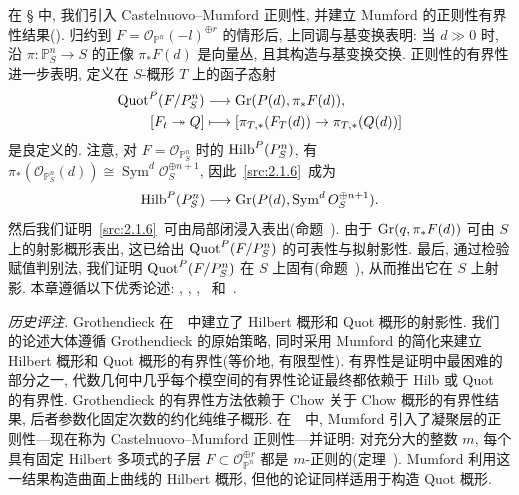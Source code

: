 在 \S{} 中, 我们引入 Castelnuovo--Mumford 正则性, 并建立 Mumford 的正则性有界性结果().
归约到 $F=\mathcal O_{\mathbb P^n}(-l)^{\oplus r}$ 的情形后, 上同调与基变换表明: 当 $d\gg0$ 时, 沿 $\pi:\mathbb P_S^n\to S$ 的正像 $\pi_*F(d)$ 是向量丛, 且其构造与基变换交换. 正则性的有界性进一步表明, 定义在 $S$-概形 $T$ 上的函子态射
\begin{equation}\label{src:2.1.6}
\begin{aligned}
\operatorname{Quot}^P(F/P_S^n)&\longrightarrow\operatorname{Gr}(P(d),\pi_*F(d)),\\
[F_t\twoheadrightarrow Q]&\longmapsto
[\pi_{T,*}(F_T(d))\to\pi_{T,*}(Q(d))]
\end{aligned}
\end{equation}
是良定义的. 注意, 对 $F=\mathcal O_{\mathbb P_S^n}$ 时的 $\operatorname{Hilb}^P(P_S^n)$, 有
$\pi_*(\mathcal O_{\mathbb P_S^n}(d))\cong\operatorname{Sym}^d\mathcal O_S^{\oplus n+1}$, 
因此~\eqref{src:2.1.6}~成为
\[
\operatorname{Hilb}^P(P_S^n)\longrightarrow
\operatorname{Gr}(P(d),\operatorname{Sym}^dO_S^{\oplus n+1}).
\]
然后我们证明~\eqref{src:2.1.6}~可由局部闭浸入表出(命题~).
由于 $\operatorname{Gr}(q,\pi_*F(d))$ 可由 $S$ 上的射影概形表出, 这已给出 $\operatorname{Quot}^P(F/P_S^n)$ 的可表性与拟射影性.
最后, 通过检验赋值判别法, 我们证明 $\operatorname{Quot}^P(F/P_S^n)$ 在 $S$ 上固有(命题~), 从而推出它在 $S$ 上射影.
本章遵循以下优秀论述: \cite[\S$14$--$15$]{Mum66a}, \cite[\S$2$]{AK80}, \cite[\S$1$]{Kol96}, \cite[\S$1.8$]{Laz04a}~和~\cite{Nit05}.

\textit{历史评注.} Grothendieck 在~\cite[定理 $3.2$]{FGAIV}~中建立了 Hilbert 概形和 Quot 概形的射影性.
我们的论述大体遵循 Grothendieck 的原始策略, 同时采用 Mumford 的简化来建立 Hilbert 概形和 Quot 概形的有界性(等价地, 有限型性).
有界性是证明中最困难的部分之一, 代数几何中几乎每个模空间的有界性论证最终都依赖于 Hilb 或 Quot 的有界性.
Grothendieck 的有界性方法依赖于 Chow 关于 Chow 概形的有界性结果, 后者参数化固定次数的约化纯维子概形.
在~\cite{Mum66a}~中, Mumford 引入了凝聚层的正则性---现在称为 Castelnuovo--Mumford 正则性---并证明: 对充分大的整数 $m$, 每个具有固定 Hilbert 多项式的子层 $F\subset\mathcal O_{\mathbb P^n}^{\oplus r}$ 都是 $m$-正则的(定理~).
Mumford 利用这一结果构造曲面上曲线的 Hilbert 概形, 但他的论证同样适用于构造 Quot 概形.
